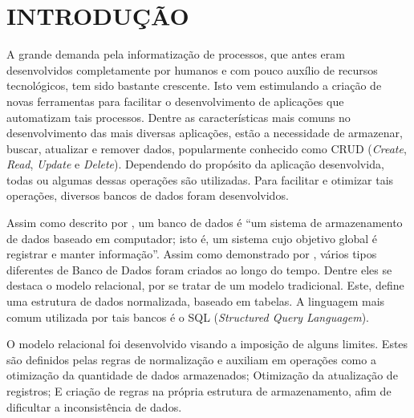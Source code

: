 \chapter{INTRODUÇÃO}
\label{Introducao}

A grande demanda pela informatização de processos, que antes eram desenvolvidos completamente por humanos e com pouco auxílio de recursos tecnológicos, tem sido bastante crescente. Isto vem estimulando a criação de novas ferramentas para facilitar o desenvolvimento de aplicações que automatizam tais processos. Dentre as características mais comuns no desenvolvimento das mais diversas aplicações, estão a necessidade de armazenar, buscar, atualizar e remover dados, popularmente conhecido como CRUD (\textit{Create}, \textit{Read}, \textit{Update} e \textit{Delete}). Dependendo do propósito da aplicação desenvolvida, todas ou algumas dessas operações são utilizadas. Para facilitar e otimizar tais operações, diversos bancos de dados foram desenvolvidos.


Assim como descrito por , um banco de dados é ``um sistema de armazenamento de dados baseado em computador; isto é, um sistema cujo objetivo global é registrar e manter informação''. Assim como demonstrado por , vários tipos diferentes de Banco de Dados foram criados ao longo do tempo. Dentre eles se destaca o modelo relacional, por se tratar de um modelo tradicional. Este, define uma estrutura de dados normalizada, baseado em tabelas. A linguagem mais comum  utilizada por tais bancos é o SQL (\textit{Structured Query Languagem}).


O modelo relacional foi desenvolvido visando a imposição de alguns limites. Estes são definidos pelas regras de normalização e auxiliam em operações como a otimização da quantidade de dados armazenados; Otimização da atualização de registros; E criação de regras na própria estrutura de armazenamento, afim de dificultar a inconsistência de dados.

